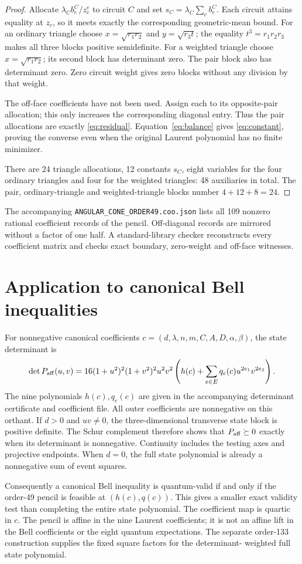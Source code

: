 \documentclass[11pt]{article}
\newcommand{\pos}{\succeq0}
\begin{document}
\begin{proof}
Allocate $\lambda_C b^C_e/z_c^e$ to circuit $C$ and set
$s_C=\lambda_C\sum_e b^C_e$. Each circuit attains equality at $z_c$,
so it meets exactly the corresponding geometric-mean bound. For an
ordinary triangle choose $x=\sqrt{r_1r_2}$ and
$y=\sqrt{r_3t}$; the equality $t^3=r_1r_2r_3$ makes all three
blocks positive semidefinite. For a weighted triangle choose
$x=\sqrt{r_1r_2}$; its second block has determinant zero.
The pair block also has determinant zero. Zero circuit weight gives
zero blocks without any division by that weight.

The off-face coefficients have not been used. Assign each to its
opposite-pair allocation; this only increases the corresponding
diagonal entry. Thus the pair allocations are exactly
\eqref{eq:residual}. Equation~\eqref{eq:balance} gives
\eqref{eq:constant}, proving the converse even when the original
Laurent polynomial has no finite minimizer.

There are 24 triangle allocations, 12 constants $s_C$, eight
variables for the four ordinary triangles and four for the weighted
triangles: 48 auxiliaries in total. The pair, ordinary-triangle and
weighted-triangle blocks number $4+12+8=24$.
\end{proof}

The accompanying \texttt{ANGULAR\_CONE\_ORDER49.coo.json} lists all
109 nonzero rational coefficient records of the pencil. Off-diagonal
records are mirrored without a factor of one half. A standard-library
checker reconstructs every coefficient matrix and checks exact boundary,
zero-weight and off-face witnesses.

\section{Application to canonical Bell inequalities}

For nonnegative canonical coefficients
$c=(d,\lambda,n,m,C,A,D,\alpha,\beta)$, the state determinant is
\[
 \det P_{\rm aff}(u,v)
 =16(1+u^2)^2(1+v^2)^2u^2v^2
       \left(h(c)+\sum_{e\in E}q_e(c)u^{2e_1}v^{2e_2}\right).
\]
The nine polynomials $h(c),q_e(c)$ are given in the accompanying
determinant certificate and coefficient file. All outer coefficients
are nonnegative on this orthant. If $d>0$ and $uv\ne0$, the
three-dimensional transverse state block is positive definite.
The Schur complement therefore shows that $P_{\rm aff}\pos$ exactly
when its determinant is nonnegative. Continuity includes the testing
axes and projective endpoints. When $d=0$, the full state polynomial
is already a nonnegative sum of event squares.

Consequently a canonical Bell inequality is quantum-valid if and only
if the order-49 pencil is feasible at $(h(c),q(c))$. This gives a smaller
exact validity test than completing the entire state polynomial.
The coefficient map is quartic in $c$. The pencil is affine in the
nine Laurent coefficients; it is not an affine lift in the Bell
coefficients or the eight quantum expectations. The separate order-133
construction supplies the fixed square factors for the determinant-
weighted full state polynomial.
\end{document}
